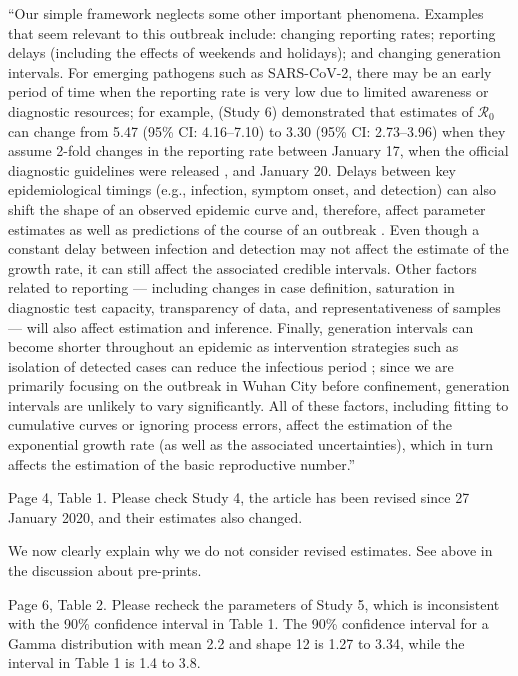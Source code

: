 \documentclass[12pt]{article}
\newcommand{\Ro}{\ensuremath{{\mathcal R}_{0}}\xspace}
\newcommand{\revtext}{\textsf}
\begin{document}
``Our simple framework neglects some other important phenomena.
Examples that seem relevant to this outbreak include: changing reporting rates; reporting delays (including the effects of weekends and holidays); and changing generation intervals.
For emerging pathogens such as SARS-CoV-2, there may be an early period of time when the reporting rate is very low due to limited awareness or diagnostic resources;
for example, \cite{zhaoncov} (Study 6) demonstrated that estimates of \Ro can change from 5.47 (95\% CI: 4.16--7.10) to 3.30 (95\% CI: 2.73--3.96) when they assume 2-fold changes in the reporting rate between January 17, when the official diagnostic guidelines were released \citep{who17protocol}, and January 20.
Delays between key epidemiological timings (e.g., infection, symptom onset, and detection) can also shift the shape of an observed epidemic curve and, therefore, affect parameter estimates as well as predictions of the course of an outbreak \citep{tariq2019assessing}.
Even though a constant delay between infection and detection may not affect the estimate of the growth rate, it can still affect the associated credible intervals.
Other factors related to reporting --- including changes in case definition, saturation in diagnostic test capacity, transparency of data, and representativeness of samples --- will also affect estimation and inference.
Finally, generation intervals can become shorter throughout an epidemic as intervention strategies such as isolation of detected cases can reduce the infectious period \citep{hethcote2002effects};
since we are primarily focusing on the outbreak in Wuhan City before confinement, generation intervals are unlikely to vary significantly.
All of these factors, including fitting to cumulative curves or ignoring process errors, affect the estimation of the exponential growth rate (as well as the associated uncertainties), which in turn affects the estimation of the basic reproductive number.''

\revtext{Page 4, Table 1. Please check Study 4, the article has been revised since 27 January 2020,
and their estimates also changed.}

We now clearly explain why we do not consider revised estimates. See above in the discussion about pre-prints. 

\revtext{Page 6, Table 2. Please recheck the parameters of Study 5, which is inconsistent with the 90\%
confidence interval in Table 1. The 90\% confidence interval for a Gamma distribution with mean
2.2 and shape 12 is 1.27 to 3.34, while the interval in Table 1 is 1.4 to 3.8.}
\end{document}
